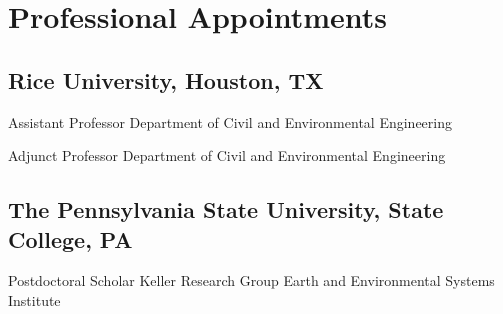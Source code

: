 \section{Professional Appointments}

\subsection{Rice University, Houston, TX}
{Assistant Professor}
{}
{Department of Civil and Environmental Engineering}
{}{}

{Adjunct Professor}
{}
{Department of Civil and Environmental Engineering}
{}{}

\subsection{The Pennsylvania State University, State College, PA}
{Postdoctoral Scholar}
{Keller Research Group}
{Earth and Environmental Systems Institute}
{}{}
